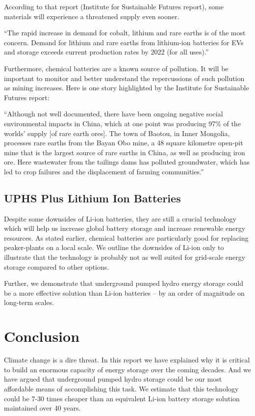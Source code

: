 \documentclass[hidelinks,12pt,a4paper]{article}
\begin{document}
According to that report (Institute for Sustainable Futures report), some materials will experience a threatened supply even sooner.

\begin{displayquote}
“The rapid increase in demand for cobalt, lithium and rare earths is of the most concern. Demand for lithium and rare earths from lithium-ion batteries for EVs and storage exceeds current production rates by 2022 (for all uses).” \cite{ResponsibleMineralsSourcingForRenewableEnergy}
\end{displayquote}

Furthermore, chemical batteries are a known source of pollution. It will be  important to monitor and better understand the repercussions of such pollution as mining increases. Here is one story highlighted by the Institute for Sustainable Futures report:

\begin{displayquote}
“Although not well documented, there have been ongoing negative social environmental impacts in China, which at one point was producing 97\% of the worlds’ supply [of rare earth ores]. The town of Baotou, in Inner Mongolia, processes rare earths from the Bayan Obo mine, a 48 square kilometre open-pit mine that is the largest source of rare earths in China, as well as producing iron ore. Here wastewater from the tailings dams has polluted groundwater, which has led to crop failures and the displacement of farming communities.” \cite{ResponsibleMineralsSourcingForRenewableEnergy}
\end{displayquote}

\subsection{UPHS Plus Lithium Ion Batteries}
Despite some downsides of Li-ion batteries, they are still a crucial technology which will help us increase global battery storage and increase renewable energy resources. As stated earlier, chemical batteries are particularly good for replacing peaker-plants on a local scale. We outline the downsides of Li-ion only to illustrate that the technology is probably not as well suited for grid-scale energy storage compared to other options.

Further, we demonstrate that underground pumped hydro energy storage could be a more effective solution than Li-ion batteries -- by an order of magnitude on long-term scales.

\pagebreak[4]
\section{Conclusion}
Climate change is a dire threat. In this report we have explained why it is critical to build an enormous capacity of energy storage over the coming decades. And we have argued that underground pumped hydro storage could be our most affordable means of accomplishing this task. We estimate that this technology could be 7-30 times cheaper than an equivalent Li-ion battery storage solution maintained over 40 years.
\end{document}
